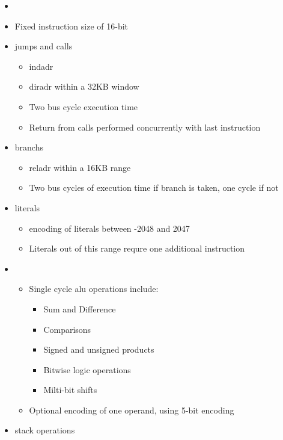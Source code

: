\begin{description}[style=nextline]
\item[Instruction set:]
  \begin{itemize}
  \item[]
  \item Fixed instruction size of 16-bit
  \item \Glspl{jump} and \glspl{call}
    \begin{itemize}
    \item \Gls{indadr}
    \item \Gls{diradr} within a 32KB window
    \item Two bus cycle execution time
    \item Return from \glspl{call} performed concurrently with last instruction
    \end{itemize}
  \item \Glspl{branch}
    \begin{itemize}
    \item {} \gls{reladr} within a 16KB range
    \item Two bus cycles of execution time if branch is taken, one cycle if not
    \end{itemize}         
  \item \Glspl{literal}
    \begin{itemize}
    \item {} encoding of literals between -2048 and 2047
    \item Literals out of this range requre one additional instruction
    \end{itemize}
  \item {}
    \begin{itemize}
    \item Single cycle \Gls{alu} operations include:
      \begin{itemize}
      \item Sum and Difference
      \item Comparisons
      \item Signed and unsigned products
      \item Bitwise logic operations
      \item Milti-bit shifts
     \end{itemize}
    \item Optional  encoding of one operand, using
      5-bit encoding 
    \end{itemize}
  \item \Gls{stack} operations

\end{itemize}
\end{description}
